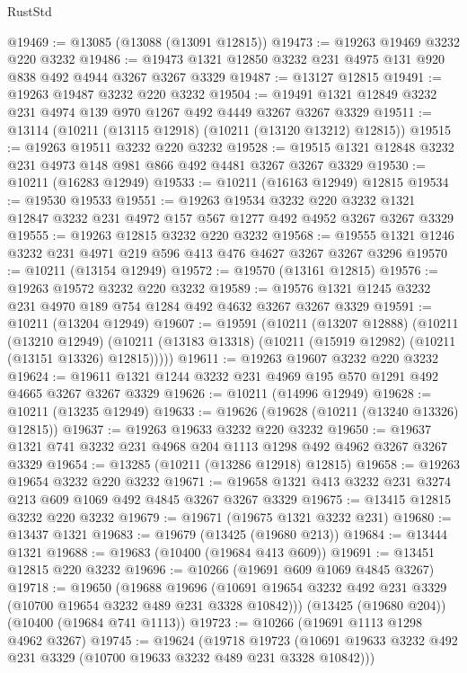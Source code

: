 \begin{lexlean}{RustStd}
\begin{coremodule}
@19469 := @13085 (@13088 (@13091 @12815))
@19473 := @19263 @19469 @3232 @220 @3232
@19486 := @19473 @1321 @12850 @3232 @231 @4975 @131 @920 @838 @492 @4944 @3267 @3267 @3329
@19487 := @13127 @12815
@19491 := @19263 @19487 @3232 @220 @3232
@19504 := @19491 @1321 @12849 @3232 @231 @4974 @139 @970 @1267 @492 @4449 @3267 @3267 @3329
@19511 := @13114 (@10211 (@13115 @12918) (@10211 (@13120 @13212) @12815))
@19515 := @19263 @19511 @3232 @220 @3232
@19528 := @19515 @1321 @12848 @3232 @231 @4973 @148 @981 @866 @492 @4481 @3267 @3267 @3329
@19530 := @10211 (@16283 @12949)
@19533 := @10211 (@16163 @12949) @12815
@19534 := @19530 @19533
@19551 := @19263
    @19534
    @3232
    @220
    @3232
    @1321
    @12847
    @3232
    @231
    @4972
    @157
    @567
    @1277
    @492
    @4952
    @3267
    @3267
    @3329
@19555 := @19263 @12815 @3232 @220 @3232
@19568 := @19555 @1321 @1246 @3232 @231 @4971 @219 @596 @413 @476 @4627 @3267 @3267 @3296
@19570 := @10211 (@13154 @12949)
@19572 := @19570 (@13161 @12815)
@19576 := @19263 @19572 @3232 @220 @3232
@19589 := @19576 @1321 @1245 @3232 @231 @4970 @189 @754 @1284 @492 @4632 @3267 @3267 @3329
@19591 := @10211 (@13204 @12949)
@19607 := @19591
    (@10211
      (@13207 @12888)
      (@10211
        (@13210 @12949)
        (@10211 (@13183 @13318) (@10211 (@15919 @12982) (@10211 (@13151 @13326) @12815)))))
@19611 := @19263 @19607 @3232 @220 @3232
@19624 := @19611 @1321 @1244 @3232 @231 @4969 @195 @570 @1291 @492 @4665 @3267 @3267 @3329
@19626 := @10211 (@14996 @12949)
@19628 := @10211 (@13235 @12949)
@19633 := @19626 (@19628 (@10211 (@13240 @13326) @12815))
@19637 := @19263 @19633 @3232 @220 @3232
@19650 := @19637 @1321 @741 @3232 @231 @4968 @204 @1113 @1298 @492 @4962 @3267 @3267 @3329
@19654 := @13285 (@10211 (@13286 @12918) @12815)
@19658 := @19263 @19654 @3232 @220 @3232
@19671 := @19658 @1321 @413 @3232 @231 @3274 @213 @609 @1069 @492 @4845 @3267 @3267 @3329
@19675 := @13415 @12815 @3232 @220 @3232
@19679 := @19671 (@19675 @1321 @3232 @231)
@19680 := @13437 @1321
@19683 := @19679 (@13425 (@19680 @213))
@19684 := @13444 @1321
@19688 := @19683 (@10400 (@19684 @413 @609))
@19691 := @13451 @12815 @220 @3232
@19696 := @10266 (@19691 @609 @1069 @4845 @3267)
@19718 := @19650
    (@19688
      @19696
      (@10691 @19654 @3232 @492 @231 @3329 (@10700 @19654 @3232 @489 @231 @3328 @10842)))
    (@13425 (@19680 @204))
    (@10400 (@19684 @741 @1113))
@19723 := @10266 (@19691 @1113 @1298 @4962 @3267)
@19745 := @19624
    (@19718
      @19723
      (@10691 @19633 @3232 @492 @231 @3329 (@10700 @19633 @3232 @489 @231 @3328 @10842)))

\end{coremodule}
\end{lexlean}
